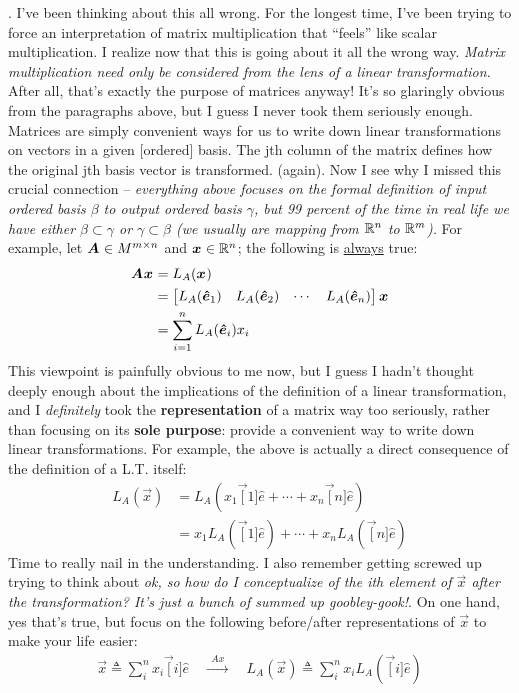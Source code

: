 \documentclass[11pt]{article}
\begin{document}
. I've been thinking about this all wrong. For the longest time, I've been trying to force an interpretation of matrix multiplication that ``feels'' like scalar multiplication. I realize now that this is going about it all the wrong way. \textit{Matrix multiplication need only be considered from the lens of a linear transformation}. After all, that's exactly the purpose of matrices anyway! It's so glaringly obvious from the paragraphs above, but I guess I never took them seriously enough. Matrices are simply convenient ways for us to write down linear transformations on vectors in a given [ordered] basis. The jth column of the matrix defines how the original jth basis vector is transformed.  (again). Now I see why I missed this crucial connection -- \textit{everything above focuses on the formal definition of input ordered basis $\beta$ to output ordered basis $\gamma$, but 99 percent of the time in real life we have either $\beta \subset \gamma$ or $\gamma \subset \beta$ (we usually are mapping from $\R^n$ to $\R^m$). } For example, let $\matr A \in M^{m \times n}$ and $\vec x \in \R^{n}$; the following is \underline{always} true:
\begin{align}
	\matr A \vec x
		&= L_A(\vec x) \\
		&= \begin{bmatrix}
			L_A(\vec[1]{\hat e}) & L_A(\vec[2]{\hat e}) & \cdots & L_A(\vec[n]{\hat e})
		\end{bmatrix}
		\vec x \\
		&= \sum_{i = 1}^{n} L_A(\vec[i]{\hat e}) x_i
\end{align}
This viewpoint is painfully obvious to me now, but I guess I hadn't thought deeply enough about the implications of the definition of a linear transformation, and I \textit{definitely} took the \textbf{representation} of a matrix way too seriously, rather than focusing on its \textbf{sole purpose}: provide a convenient way to write down linear transformations. For example, the above is actually a direct consequence of the definition of a L.T. itself:
\begin{align}
	L_A(\vec x)
		&= L_A(x_1 \vec[1]{\hat e} + \cdots + x_n \vec[n]{\hat e}) \\
		&= x_1 L_A(\vec[1]{\hat e}) + \cdots + x_n L_A(\vec[n]{\hat e})
\end{align}
Time to really nail in the understanding. I also remember getting screwed up trying to think about \textit{ok, so how do I conceptualize of the ith element of $\vec x$ \textit{after} the transformation? It's just a bunch of summed up goobley-gook!}. On one hand, yes that's true, but focus on the following before/after representations of $\vec x$ to make your life easier:
\begin{align}
	\vec{x} {\triangleq} \sum_i^n x_i \vec[i]{\hat e}
	\quad \xrightarrow{~~ Ax ~~} \quad
	L_A(\vec x) {\triangleq} \sum_i^n x_i L_A(\vec[i]{\hat e})
\end{align}
\end{document}
